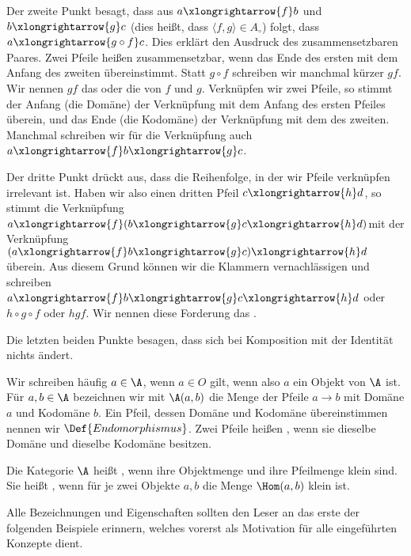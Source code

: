 Der zweite Punkt besagt, dass aus $a\xlongrightarrow{f}b$ und $b\xlongrightarrow{g}c$ (dies heißt, dass $\langle f,g\rangle\in A_\circ$) folgt, dass $a\xlongrightarrow{g\circ f}c$. Dies erklärt den Ausdruck des zusammensetzbaren Paares. Zwei Pfeile heißen zusammensetzbar, wenn das Ende des ersten mit dem Anfang des zweiten übereinstimmt. Statt $g\circ f$ schreiben wir manchmal kürzer $gf$. Wir nennen $gf$ das  oder die  von $f$ und $g$. Verknüpfen wir zwei Pfeile, so stimmt der Anfang (die Domäne) der Verknüpfung mit dem Anfang des ersten Pfeiles überein, und das Ende (die Kodomäne) der Verknüpfung mit dem des zweiten. Manchmal schreiben wir für die Verknüpfung auch $a\xlongrightarrow{f}b\xlongrightarrow{g}c$.

Der dritte Punkt drückt aus, dass die Reihenfolge, in der wir Pfeile verknüpfen irrelevant ist. Haben wir also einen dritten Pfeil $c\xlongrightarrow{h}d$, so stimmt die Verknüpfung $a\xlongrightarrow{f}(b\xlongrightarrow{g}c\xlongrightarrow{h}d)$mit der Verknüpfung $(a\xlongrightarrow{f}b\xlongrightarrow{g}c)\xlongrightarrow{h}d$ überein. Aus diesem Grund können wir die Klammern vernachlässigen und schreiben $a\xlongrightarrow{f}b\xlongrightarrow{g}c\xlongrightarrow{h}d$ oder $h\circ g\circ f$ oder $hgf$. Wir nennen diese Forderung das .

Die letzten beiden Punkte besagen, dass sich bei Komposition mit der Identität nichts ändert.

Wir schreiben häufig $a\in\A$, wenn $a\in O$ gilt, wenn also $a$ ein Objekt von $\A$ ist. Für $a,b\in\A$ bezeichnen wir mit $\A(a,b)$ die Menge der Pfeile $a\longrightarrow b$ mit Domäne $a$ und Kodomäne $b$. Ein Pfeil, dessen Domäne und Kodomäne übereinstimmen nennen wir $\Def{Endomorphismus}$. Zwei Pfeile heißen , wenn sie dieselbe Domäne und dieselbe Kodomäne besitzen.

Die Kategorie $\A$ heißt , wenn ihre Objektmenge und ihre Pfeilmenge klein sind. Sie heißt , wenn für je zwei Objekte $a,b$ die Menge $\Hom(a,b)$ klein ist.

Alle Bezeichnungen und Eigenschaften sollten den Leser an das erste der folgenden Beispiele erinnern, welches vorerst als Motivation für alle eingeführten Konzepte dient.

